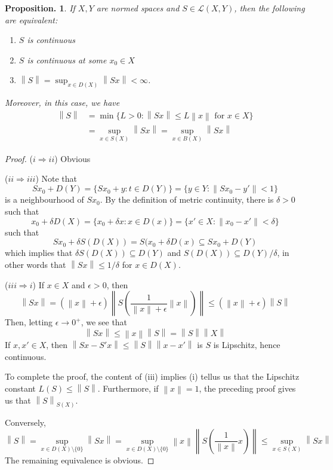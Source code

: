 \documentclass[11pt, a4paper]{memoir}
\newcommand{\imp}[2]{($#1\Rightarrow#2$)\hspace{0.2cm}}
\newcommand{\norm}[1]{\ensuremath{\left\lVert#1\right\rVert}}
\theoremstyle{change}
\newtheorem{proposition}[theorem]{Proposition.}
\theoremstyle{plain}
\theoremstyle{nonumberplain}
\newtheorem{proof}{Proof}
\numberwithin{equation}{section}
\begin{document}
\begin{proposition}
    If $X,Y$ are normed spaces and $S\in\mathcal{L}(X,Y)$, then the following are equivalent:
    \begin{enumerate}[nl,r]
        \item $S$ is continuous
        \item $S$ is continuous at some $x_0\in X$
        \item $\norm{S}=\sup_{x\in D(X)}\norm{Sx}<\infty$.
    \end{enumerate}
    Moreover, in this case, we have 
    \begin{align*}
        \norm{S}&=\min\{L>0:\norm{Sx}\leq L\norm{x}\text{ for }x\in X\}\\
                &= \sup_{x\in S(X)}\norm{Sx}=\sup_{x\in B(X)}\norm{Sx}
    \end{align*}
\end{proposition}
\begin{proof}
    \imp{i}{ii}
    Obvious

    \imp{ii}{iii}
    Note that
    \begin{equation*}
        Sx_0+D(Y) = \{Sx_0+y:t\in D(Y)\} = \{y\in Y:\norm{Sx_0-y'}<1\}
    \end{equation*}
    is a neighbourhood of $Sx_0$.
    By the definition of metric continuity, there is $\delta>0$ such that
    \begin{equation*}
        x_0+\delta D(X) = \{x_0+\delta x:x\in D(x)\}=\{x'\in X:\norm{x_0-x'}<\delta\}
    \end{equation*}
    such that
    \begin{equation*}
        Sx_0+\delta S(D(X)) = S(x_0+\delta D(x)\subseteq Sx_0+D(Y)
    \end{equation*}
    which implies that $\delta S(D(X))\subseteq D(Y)$ and $S(D(X))\subseteq D(Y)/\delta$, in other words that $\norm{Sx}\leq 1/\delta$ for $x\in D(X)$.

    \imp{iii}{i}
    If $x\in X$ and $\epsilon>0$, then
    \begin{equation*}
        \norm{Sx} = (\norm{x}+\epsilon)\norm{S\left(\frac{1}{\norm{x}+\epsilon}\norm{x}\right)}\leq(\norm{x}+\epsilon){\norm{S}}
    \end{equation*}
    Then, letting $\epsilon\to 0^+$, we see that
    \begin{equation*}
        \norm{Sx}\leq\norm{x}\norm{S}=\norm{S}\norm{X}
    \end{equation*}
    If $x,x'\in X$, then $\norm{Sx-S'x}\leq\norm{S}\norm{x-x'}$ is $S$ is Lipschitz, hence continuous.

    To complete the proof, the content of (iii) implies (i) tellus us that the Lipschitz constant $L(S)\leq\norm{S}$.
    Furthermore, if $\norm{x}=1$, the preceding proof gives us that $\norm{S}_{S(X)}$.

    Conversely,
    \begin{equation*}
        \norm{S} = \sup_{x\in D(X)\setminus\{0\}}\norm{Sx}=\sup_{x\in D(X)\setminus\{0\}}\norm{x}\norm{S\left(\frac{1}{\norm{x}}x\right)}\leq\sup_{x\in S(X)}\norm{Sx}
    \end{equation*}
    The remaining equivalence is obvious.
\end{proof}
\end{document}
